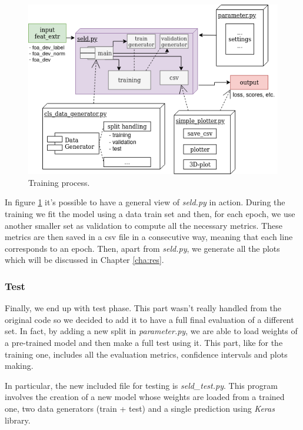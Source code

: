 \documentclass[11pt]{article}
\begin{document}
\begin{figure}[h!]
	\centering
	\includegraphics[width=13.5cm]{img/training.png}
	\caption{Training process.}
	\label{fig:training}
\end{figure}

\noindent
In figure \ref{fig:training} it's possible to have a general view of \textit{seld.py} in action. During the training we fit the model using a data train set and then, for each epoch, we use another smaller set as validation to compute all the necessary metrics. These metrics are then saved in a csv file in a consecutive way, meaning that each line corresponds to an epoch. Then, apart from \textit{seld.py}, we generate all the plots which will be discussed in Chapter \ref{cha:res}.

\newpage
\subsubsection{Test}

Finally, we end up with test phase. This part wasn't really handled from the original code so we decided to add it to have a full final evaluation of a different set. In fact, by adding a new split in \textit{parameter.py}, we are able to load weights of a pre-trained model and then make a full test using it. This part, like for the training one, includes all the evaluation metrics, confidence intervals and plots making.

In particular, the new included file for testing is \textit{seld\_test.py}. This program involves the creation of a new model whose weights are loaded from a trained one, two data generators (train + test) and a single prediction using \textit{Keras} library.
\end{document}
